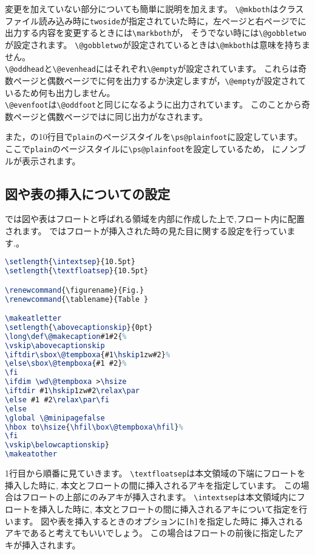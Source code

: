 変更を加えていない部分についても簡単に説明を加えます。
\verb|\@mkboth|はクラスファイル読み込み時に\texttt{twoside}が指定されていた時に，左ページと右ページでに出力する内容を変更するときには\verb|\markboth|が，
そうでない時には\verb|\@gobbletwo|が設定されます。
\verb|\@gobbletwo|が設定されているときは\verb|\@mkboth|は意味を持ちません。\\
\verb|\@oddhead|と\verb|\@evenhead|にはそれぞれ\verb|\@empty|が設定されています。
これらは奇数ページと偶数ページでに何を出力するか決定しますが，\verb|\@empty|が設定されているため何も出力しません。\\
\verb|\@evenfoot|は\verb|\@oddfoot|と同じになるように出力されています。
このことから奇数ページと偶数ページではに同じ出力がなされます。

また，の10行目で\verb|plain|のページスタイルを\verb|\ps@plainfoot|に設定しています。
ここで\verb|plain|のページスタイルに\verb|\ps@plainfoot|を設定しているため，
にノンブルが表示されます。

\subsection{図や表の挿入についての設定}

{\pLaTeX}では図や表はフロートと呼ばれる領域を内部に作成した上で,フロート内に配置されます。
ではフロートが挿入された時の見た目に関する設定を行っています.。
\begin{lstlisting}[caption = フロートついての設定, label = list:float, language = tex]
\setlength{\intextsep}{10.5pt}
\setlength{\textfloatsep}{10.5pt}

\renewcommand{\figurename}{Fig.}
\renewcommand{\tablename}{Table }

\makeatletter
\setlength{\abovecaptionskip}{0pt}
\long\def\@makecaption#1#2{%
\vskip\abovecaptionskip
\iftdir\sbox\@tempboxa{#1\hskip1zw#2}%
\else\sbox\@tempboxa{#1 #2}%
\fi
\ifdim \wd\@tempboxa >\hsize
\iftdir #1\hskip1zw#2\relax\par
\else #1 #2\relax\par\fi
\else
\global \@minipagefalse
\hbox to\hsize{\hfil\box\@tempboxa\hfil}%
\fi
\vskip\belowcaptionskip}
\makeatother
\end{lstlisting}

1行目から順番に見ていきます。
\verb|\textfloatsep|は本文領域の下端にフロートを挿入した時に,
本文とフロートの間に挿入されるアキを指定しています。
この場合はフロートの上部にのみアキが挿入されます。
\verb|\intextsep|は本文領域内にフロートを挿入した時に,
本文とフロートの間に挿入されるアキについて指定を行います。
図や表を挿入するときのオプションに\texttt{[h]}を指定した時に
挿入されるアキであると考えてもいいでしょう。
この場合はフロートの前後に指定したアキが挿入されます。

